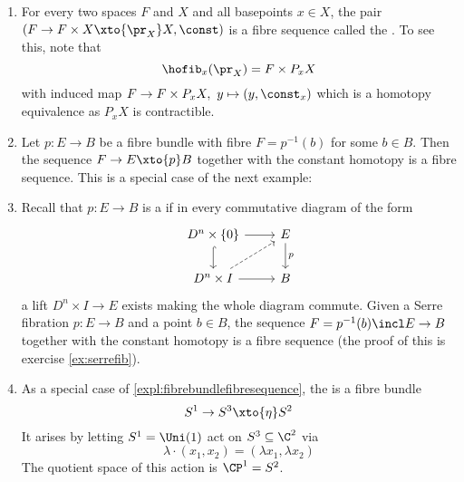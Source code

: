 \begin{example}
	\leavevmode
	\begin{enumerate}[resume]
		\item For every two spaces $F$ and $X$ and all basepoints $x \in X$, the pair $(F \to F \times X \xto{\pr_X} X, \const)$ is a fibre sequence called the .
			To see this, note that
			\begin{equation*}
				\hofib_x(\pr_X) = F \times P_x X
			\end{equation*}
			with induced map $F \to F \times P_x X,\ y \mapsto (y, \const_x)$ which is a homotopy equivalence as $P_x X$ is contractible.
		\item\label{expl:fibrebundlefibresequence} Let $p\colon E \to B$ be a fibre bundle with fibre $F = p^{-1}(b)$ for some $b \in B$.
			Then the sequence $F \to E \xto{p} B$ together with the constant homotopy is a fibre sequence.
			This is a special case of the next example:
		\item Recall that $p\colon E \to B$ is a  if in every commutative diagram of the form
			\begin{equation*}
				\begin{tikzcd}
					D^n \times \{0\}
							\ar[r]
							\ar[d, hook]
						& E
							\ar[d, "p"]
					\\
					D^n \times I
							\ar[r]
							\ar[ur, dashed]
						& B
				\end{tikzcd}
			\end{equation*}
			a lift $D^n \times I \to E$ exists making the whole diagram commute.
			Given a Serre fibration $p\colon E \to B$ and a point $b \in B$, the sequence $F = p^{-1}(b) \incl E \to B$ together with the constant homotopy is a fibre sequence (the proof of this is exercise \ref{ex:serrefib}).
		\item\label{expl:hopfbundle} As a special case of \ref{expl:fibrebundlefibresequence}, the  is a fibre bundle
			\begin{equation*}
				S^1 \to S^3 \xto{\eta} S^2
			\end{equation*}
			It arises by letting $S^1 = \Uni(1)$ act on $S^3 \subseteq \C^2$ via
			\begin{equation*}
				\lambda \cdot (x_1, x_2) = (\lambda x_1, \lambda x_2)
			\end{equation*}
			The quotient space of this action is $\CP^1 = S^2$.

\end{enumerate}
\end{example}
